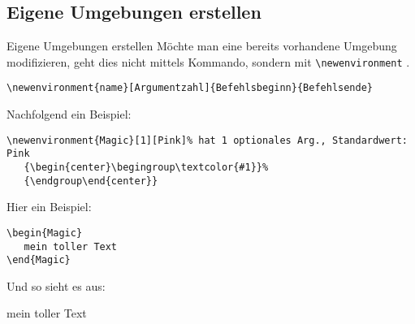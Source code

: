 \subsection{Eigene Umgebungen erstellen}
\begin{frame}[fragile]{Eigene Umgebungen erstellen}
Möchte man eine bereits vorhandene Umgebung modifizieren, geht dies nicht mittels Kommando, sondern mit \verb|\newenvironment| .

\begin{lstlisting}[style=tex]
\newenvironment{name}[Argumentzahl]{Befehlsbeginn}{Befehlsende}\end{lstlisting}

\pause Nachfolgend ein Beispiel:

\begin{lstlisting}[style=tex]
\newenvironment{Magic}[1][Pink]% hat 1 optionales Arg., Standardwert: Pink
   {\begin{center}\begingroup\textcolor{#1}}%
   {\endgroup\end{center}}\end{lstlisting}
\pause

\begin{multicols}{2}
Hier ein Beispiel:
\begin{lstlisting}[style=tex]
\begin{Magic}
   mein toller Text
\end{Magic}
\end{lstlisting}

Und so sieht es aus:
\vspace{0.75ex}
\begin{Magic}
   mein toller Text
\end{Magic}
\vspace{0.75ex}
\end{multicols}
\end{frame}